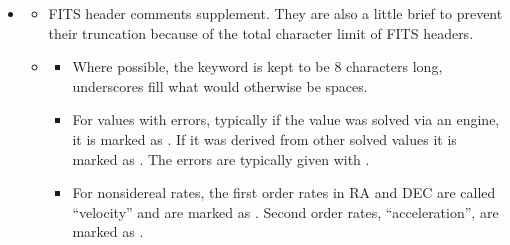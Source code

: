 \documentclass[letterpaper,11pt,english]{sphinxmanual}
\begin{document}
\begin{itemize}
\begin{description}
\begin{itemize}
\end{itemize}

\end{description}

\item {} \begin{description}
\begin{itemize}
\item {} 
\sphinxAtStartPar
FITS header comments supplement. They are also a little brief to prevent their truncation because of the total character limit of FITS headers.

\item {} \begin{description}
\begin{itemize}
\item {} 
\sphinxAtStartPar
Where possible, the keyword is kept to be 8 characters long, underscores fill what would otherwise be spaces.

\item {} 
\sphinxAtStartPar
For values with errors, typically if the value was solved via an engine, it is marked as . If it was derived from other solved values it is marked as . The errors are typically given with .

\item {} 
\sphinxAtStartPar
For non\sphinxhyphen{}sidereal rates, the first order rates in RA and DEC are called “velocity” and are marked as . Second order rates, “acceleration”, are marked as .

\end{itemize}

\end{description}

\end{itemize}

\end{description}

\end{itemize}

\sphinxstepscope
\end{document}
